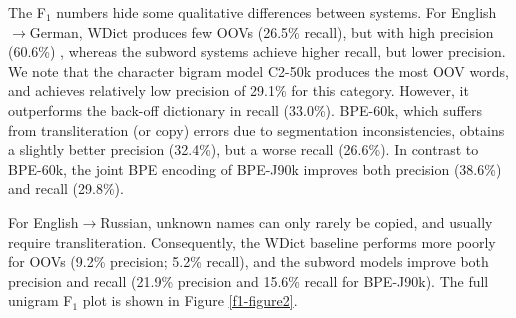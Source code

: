 \documentclass[11pt]{article}
\begin{document}
The F$_1$ numbers hide some qualitative differences between systems.
For English$\to$German, WDict produces few OOVs (26.5\% recall), but with high precision (60.6\%) , whereas the subword systems achieve higher recall, but lower precision.
We note that the character bigram model C2-50k produces the most OOV words, and achieves relatively low precision of 29.1\% for this category.
However, it outperforms the back-off dictionary in recall (33.0\%).
BPE-60k, which suffers from transliteration (or copy) errors due to segmentation inconsistencies, obtains a slightly better precision (32.4\%), but a worse recall (26.6\%).
In contrast to BPE-60k, the joint BPE encoding of BPE-J90k improves both precision (38.6\%) and recall (29.8\%).

For English$\to$Russian, unknown names can only rarely be copied, and usually require transliteration.
Consequently, the WDict baseline performs more poorly for OOVs (9.2\% precision; 5.2\% recall), and the subword models improve both precision and recall (21.9\% precision and 15.6\% recall for BPE-J90k).
The full unigram F$_1$ plot is shown in Figure \ref{f1-figure2}.
\end{document}
